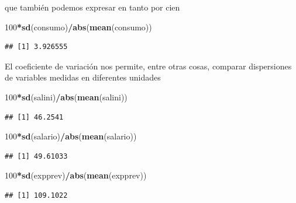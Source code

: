 \documentclass[]{book}
\newenvironment{Shaded}{\begin{snugshade}}{\end{snugshade}}
\newcommand{\KeywordTok}[1]{\textcolor[rgb]{0.13,0.29,0.53}{\textbf{#1}}}
\newcommand{\DecValTok}[1]{\textcolor[rgb]{0.00,0.00,0.81}{#1}}
\newcommand{\OperatorTok}[1]{\textcolor[rgb]{0.81,0.36,0.00}{\textbf{#1}}}
\newcommand{\NormalTok}[1]{#1}
\begin{document}
que también podemos expresar en tanto por cien

\begin{Shaded}
\begin{Highlighting}[]
\DecValTok{100}\OperatorTok{*}\KeywordTok{sd}\NormalTok{(consumo)}\OperatorTok{/}\KeywordTok{abs}\NormalTok{(}\KeywordTok{mean}\NormalTok{(consumo))}
\end{Highlighting}
\end{Shaded}

\begin{verbatim}
## [1] 3.926555
\end{verbatim}

El coeficiente de variación nos permite, entre otras cosas, comparar
dispersiones de variables medidas en diferentes unidades

\begin{Shaded}
\begin{Highlighting}[]
\DecValTok{100}\OperatorTok{*}\KeywordTok{sd}\NormalTok{(salini)}\OperatorTok{/}\KeywordTok{abs}\NormalTok{(}\KeywordTok{mean}\NormalTok{(salini))}
\end{Highlighting}
\end{Shaded}

\begin{verbatim}
## [1] 46.2541
\end{verbatim}

\begin{Shaded}
\begin{Highlighting}[]
\DecValTok{100}\OperatorTok{*}\KeywordTok{sd}\NormalTok{(salario)}\OperatorTok{/}\KeywordTok{abs}\NormalTok{(}\KeywordTok{mean}\NormalTok{(salario))}
\end{Highlighting}
\end{Shaded}

\begin{verbatim}
## [1] 49.61033
\end{verbatim}

\begin{Shaded}
\begin{Highlighting}[]
\DecValTok{100}\OperatorTok{*}\KeywordTok{sd}\NormalTok{(expprev)}\OperatorTok{/}\KeywordTok{abs}\NormalTok{(}\KeywordTok{mean}\NormalTok{(expprev))}
\end{Highlighting}
\end{Shaded}

\begin{verbatim}
## [1] 109.1022
\end{verbatim}
\end{document}
